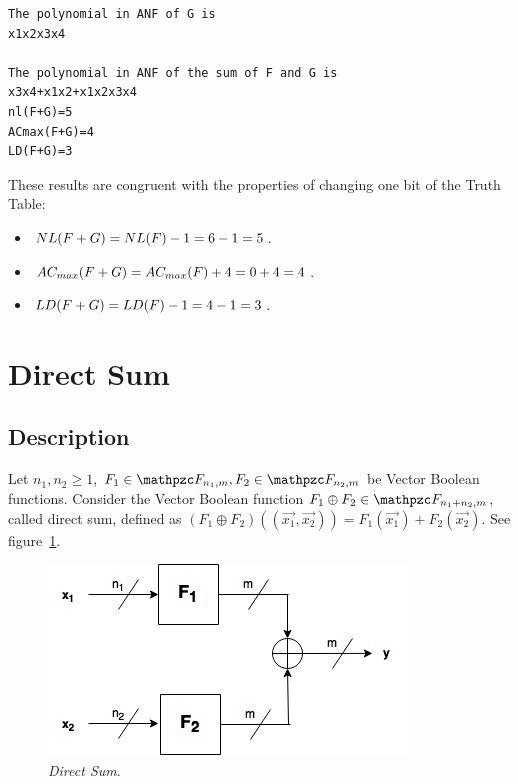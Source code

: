 \begin{example}
\begin{verbatim}
The polynomial in ANF of G is
x1x2x3x4

The polynomial in ANF of the sum of F and G is
x3x4+x1x2+x1x2x3x4
nl(F+G)=5
ACmax(F+G)=4
LD(F+G)=3
\end{verbatim}

These results are congruent with the properties of changing one bit of the Truth Table:

\begin{itemize}

\item $\crit{NL}(F+G)=\crit{NL}(F)-1=6-1=5$.

\item $\crit{AC_{max}}(F+G)=\crit{AC_{max}}(F)+4=0+4=4$.

\item $\crit{LD}(F+G)=\crit{LD}(F)-1=4-1=3$.

\end{itemize}

\end{example}

\section{Direct Sum}

\subsection{Description}

\begin{definition}
Let $n_1,n_2 \geq 1$, $F_1 \in \funct{F}_{n_1,m}, F_2 \in \funct{F}_{n_2,m}$ be Vector Boolean functions. Consider the Vector Boolean function $F_1 \oplus F_2 \in \funct{F}_{n_1+n_2,m}$, called direct sum, defined as $(F_1 \oplus F_2) \left( (\vec{x_1},\vec{x_2}) \right)= F_1(\vec{x_1}) + F_2(\vec{x_2})$. See figure~\ref{fig:DirectSum}.
\end{definition}

\begin{figure}[htbp!]
\centering
\includegraphics{DirectSum}
\caption[Direct Sum]{\textit{Direct Sum}.}
\label{fig:DirectSum}
\end{figure}

